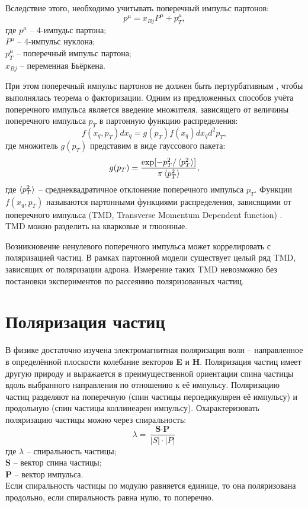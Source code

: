 \documentclass{extreport}
\begin{document}
Вследствие этого, необходимо учитывать поперечный импульс партонов:
\begin{equation}
	p^{\mu} = x_{Bj}P^{\mu} + p_{T}^{\mu},
\end{equation}
где $p^{\mu}$ -- 4-импудьс партона; \\
$P^{\mu}$ -- 4-импульс нуклона; \\
$p_{T}^{\mu}$ -- поперечный импульс партона; \\
$x_{Bj}$ -- переменная Бьёркена.

При этом поперечный импульс партонов не должен быть пертурбативным \cite{Lewis_2020}, чтобы выполнялась теорема о факторизации. Одним из предложенных способов учёта поперечного импульса является введение множителя, зависящего от величины поперечного импульса $p_{T}$ в партонную функцию распределения:
\begin{equation}
	f(x_q, p_{T})dx_q =g(p_{T}) f(x_q) dx_q d^2p_{T},
\end{equation}
где множитель $g(p_{T})$ представим в виде гауссового пакета:
\begin{equation}
	g(p_{T}) = \frac{\exp [-p^2_{T} / \braket{p^2_T}]}{\pi \braket{p^2_T}},
\end{equation}
где $\braket{p^2_T}$ -- среднеквадратичное отклонение поперечного импульса $p_T$.
Функции $f(x_q, p_{T})$ называются партонными функциями распределения, зависящими от поперечного импульса (TMD, Transverse Momentum Dependent function) \cite{Arbuzov_2020}. TMD можно разделить на кварковые и глюонные. 

Возникновение ненулевого поперечного импульса может коррелировать с поляризацией частиц. В рамках партонной модели существует целый ряд TMD, зависящих от поляризации адрона. Измерение таких TMD невозможно без постановки экспериментов по рассеянию поляризованных частиц. 

\section{Поляризация частиц}

 В физике достаточно изучена электромагнитная поляризация волн – направленное в определённой плоскости колебание векторов \textbf{E} и \textbf{H}. Поляризация частиц имеет другую природу и выражается в преимущественной ориентации спина частицы вдоль выбранного направления по отношению к её импульсу. Поляризацию частиц разделяют на поперечную (спин частицы перпедикулярен её импульсу) и продольную (спин частицы коллинеарен импульсу). 
 Охарактеризовать поляризацию частицы можно через спиральность:
 \begin{equation}
     \lambda = \frac{\textbf{S} \cdot \textbf{P}}{|S|\cdot |P|}
 \end{equation}
где $\lambda$ -- спиральность частицы; \\ \textbf{S} – вектор спина частицы; \\ \textbf{P} – вектор импульса. \\ 
Если спиральность частицы по модулю равняется единице, то она поляризована продольно, если спиральность равна нулю, то поперечно. 
\end{document}
